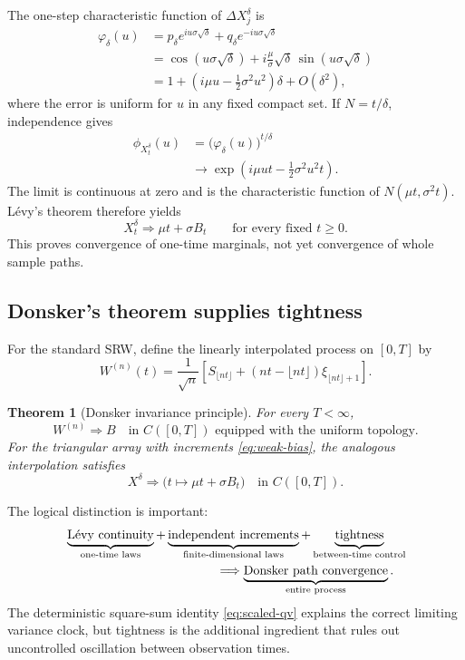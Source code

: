 \documentclass[10pt,a4paper]{article}
\numberwithin{equation}{section}
\theoremstyle{blueplain}
\newtheorem{theorem}{Theorem}[section]
\theoremstyle{definition}
\begin{document}
The one-step characteristic function of \(\Delta X_j^\delta\) is
\begin{align}
  \varphi_\delta(u)
  &=p_\delta e^{iu\sigma\sqrt\delta}
    +q_\delta e^{-iu\sigma\sqrt\delta}\\
  &=\cos(u\sigma\sqrt\delta)
    +i\frac{\mu}{\sigma}\sqrt\delta\,
      \sin(u\sigma\sqrt\delta)\\
  &=1+\left(i\mu u-\frac12\sigma^2u^2\right)\delta
    +O(\delta^2),
  \label{eq:one-step-cf}
\end{align}
where the error is uniform for \(u\) in any fixed compact set.  If
\(N=t/\delta\), independence gives
\begin{align}
  \phi_{X_t^\delta}(u)
  &=\bigl(\varphi_\delta(u)\bigr)^{t/\delta}\\
  &\longrightarrow
  \exp\!\left(i\mu ut-\frac12\sigma^2u^2t\right).
  \label{eq:arw-cf-limit}
\end{align}
The limit is continuous at zero and is the characteristic function of
\(N(\mu t,\sigma^2t)\).  L\'evy's theorem therefore yields
\begin{equation}
  X_t^\delta\Rightarrow \mu t+\sigma B_t
  \qquad\text{for every fixed }t\ge0.
  \label{eq:fixed-time-arw-convergence}
\end{equation}
This proves convergence of one-time marginals, not yet convergence of whole
sample paths.

\subsection{Donsker's theorem supplies tightness}

For the standard SRW, define the linearly interpolated process on
\([0,T]\) by
\begin{equation}
  W^{(n)}(t)
  =\frac1{\sqrt n}\left[
    S_{\lfloor nt\rfloor}
    +(nt-\lfloor nt\rfloor)\xi_{\lfloor nt\rfloor+1}
  \right].
  \label{eq:donsker-interpolation}
\end{equation}

\begin{theorem}[Donsker invariance principle]
For every \(T<\infty\),
\[
  W^{(n)}\Rightarrow B
  \quad\text{in }C([0,T])
  \text{ equipped with the uniform topology}.
\]
For the triangular array with increments
\eqref{eq:weak-bias}, the analogous interpolation satisfies
\[
  X^\delta\Rightarrow
  \bigl(t\mapsto\mu t+\sigma B_t\bigr)
  \quad\text{in }C([0,T]).
\]
\end{theorem}

The logical distinction is important:
\begin{align*}
  &\underbrace{\text{L\'evy continuity}}_{\text{one-time laws}}
  +\underbrace{\text{independent increments}}_{\text{finite-dimensional laws}}
  +\underbrace{\text{tightness}}_{\text{between-time control}}\\
  &\hspace{42mm}\Longrightarrow
  \underbrace{\text{Donsker path convergence}}_{\text{entire process}}.
\end{align*}
The deterministic square-sum identity \eqref{eq:scaled-qv} explains the
correct limiting variance clock, but tightness is the additional ingredient
that rules out uncontrolled oscillation between observation times.
\end{document}
